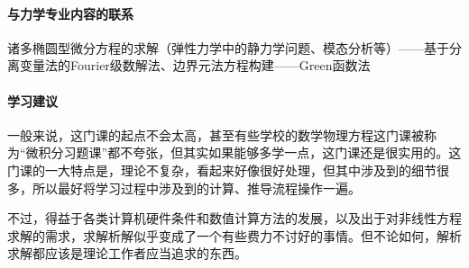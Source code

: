 \paragraph{与力学专业内容的联系}

诸多椭圆型微分方程的求解（弹性力学中的静力学问题、模态分析等）——基于分离变量法的Fourier级数解法、边界元法方程构建——Green函数法

\paragraph{学习建议}

一般来说，这门课的起点不会太高，甚至有些学校的数学物理方程这门课被称为“微积分习题课”都不夸张，但其实如果能够多学一点，这门课还是很实用的。这门课的一大特点是，理论不复杂，看起来好像很好处理，但其中涉及到的细节很多，所以最好将学习过程中涉及到的计算、推导流程操作一遍。

不过，得益于各类计算机硬件条件和数值计算方法的发展，以及出于对非线性方程求解的需求，求解析解似乎变成了一个有些费力不讨好的事情。但不论如何，解析求解都应该是理论工作者应当追求的东西。

